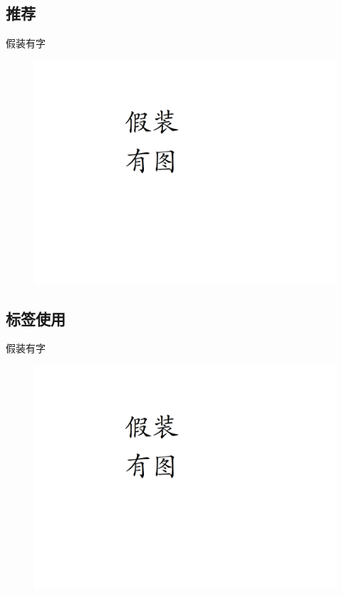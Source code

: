 \documentclass[UTF8]{ctexart}
\begin{document}
\newpage
\subsection{推荐}
假装有字
\begin{figure}[h]
    \centering
    \includegraphics[width=\textwidth]{manual_images//temp.png}
\end{figure}

\newpage
\subsection{标签使用}
假装有字
\begin{figure}[h]
    \centering
    \includegraphics[width=\textwidth]{manual_images//temp.png}
\end{figure}
\end{document}
